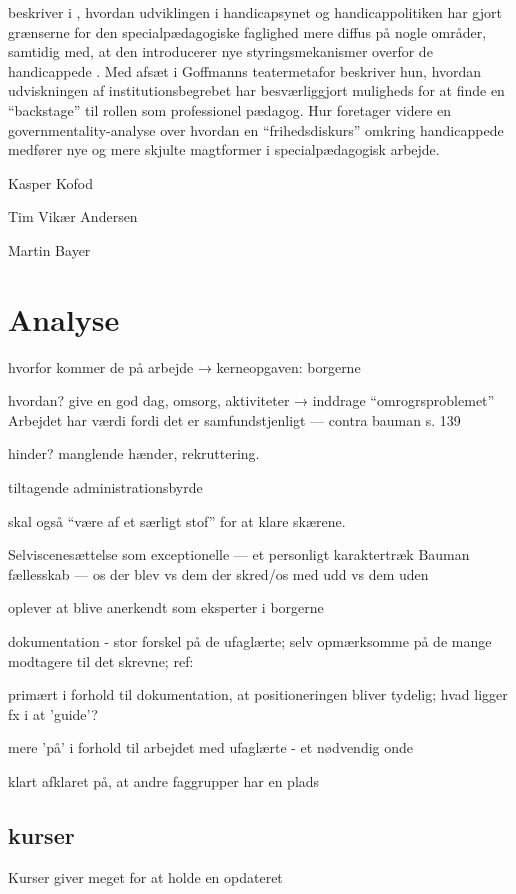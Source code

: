 \citeauthor{hurFrigorelsensMagt2015} beskriver i , hvordan udviklingen i handicapsynet og handicappolitiken har gjort grænserne for den specialpædagogiske faglighed mere diffus på nogle områder, samtidig med, at den introducerer nye styringsmekanismer overfor de handicappede \autocite{hurFrigorelsensMagt2015}.
Med afsæt i Goffmanns teatermetafor beskriver hun, hvordan udviskningen af institutionsbegrebet har besværliggjort muligheds for at finde en “backstage” til rollen som professionel pædagog.
Hur foretager videre en governmentality-analyse over hvordan en “frihedsdiskurs” omkring handicappede medfører nye og mere skjulte magtformer i specialpædagogisk arbejde.

Kasper Kofod

Tim Vikær Andersen

Martin Bayer

\section{Analyse}
hvorfor kommer de på arbejde → kerneopgaven: borgerne

hvordan? give en god dag, omsorg, aktiviteter → inddrage “omrogrsproblemet” \autocite[s.455ff]{hansbolKonstruktionAfProfessionel2008}
Arbejdet har værdi fordi det er samfundstjenligt — contra bauman s. 139

hinder? manglende hænder, rekruttering.

tiltagende administrationsbyrde \autocite[s. 16]{mik-meyerIndledningSkabeProfessionel2012}

skal også “være af et særligt stof” for at klare skærene.

Selviscenesættelse som exceptionelle --- et personligt karaktertræk
Bauman fællesskab — os der blev vs dem der skred/os med udd vs dem uden

oplever at blive anerkendt som eksperter i borgerne

dokumentation - stor forskel på de ufaglærte; selv opmærksomme på de mange modtagere til det skrevne; ref: \autocite{hjerrildNarViSkriver2017, andersenUndervisningInstitutionOg2019}

primært i forhold til dokumentation, at positioneringen bliver tydelig; hvad ligger fx i at 'guide'?

mere 'på' i forhold til arbejdet med ufaglærte - et nødvendig onde

klart afklaret på, at andre faggrupper har en plads

\subsection{kurser}
Kurser giver meget for at holde en opdateret

